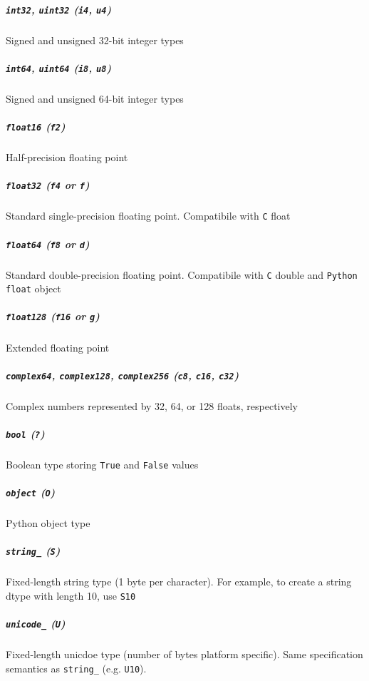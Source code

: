 \documentclass{article}
\begin{document}
\subparagraph{\texttt{int32}, \texttt{uint32} (\texttt{i4},
\texttt{u4})}\label{int32-uint32-i4-u4}

Signed and unsigned 32-bit integer types

\subparagraph{\texttt{int64}, \texttt{uint64} (\texttt{i8},
\texttt{u8})}\label{int64-uint64-i8-u8}

Signed and unsigned 64-bit integer types

\subparagraph{\texttt{float16} (\texttt{f2})}\label{float16-f2}

Half-precision floating point

\subparagraph{\texttt{float32} (\texttt{f4} or
\texttt{f})}\label{float32-f4-or-f}

Standard single-precision floating point. Compatibile with \texttt{C}
float

\subparagraph{\texttt{float64} (\texttt{f8} or
\texttt{d})}\label{float64-f8-or-d}

Standard double-precision floating point. Compatibile with \texttt{C}
double and \texttt{Python} \texttt{float} object

\subparagraph{\texttt{float128} (\texttt{f16} or
\texttt{g})}\label{float128-f16-or-g}

Extended floating point

\subparagraph{\texttt{complex64}, \texttt{complex128},
\texttt{complex256} (\texttt{c8}, \texttt{c16},
\texttt{c32})}\label{complex64-complex128-complex256-c8-c16-c32}

Complex numbers represented by 32, 64, or 128 floats, respectively

\subparagraph{\texttt{bool} (\texttt{?})}\label{bool}

Boolean type storing \texttt{True} and \texttt{False} values

\subparagraph{\texttt{object} (\texttt{O})}\label{object-o}

Python object type

\subparagraph{\texttt{string\_} (\texttt{S})}\label{stringux5f-s}

Fixed-length string type (1 byte per character). For example, to create
a string dtype with length 10, use \texttt{S10}

\subparagraph{\texttt{unicode\_} (\texttt{U})}\label{unicodeux5f-u}

Fixed-length unicdoe type (number of bytes platform specific). Same
specification semantics as \texttt{string\_} (e.g. \texttt{U10}).
\end{document}
